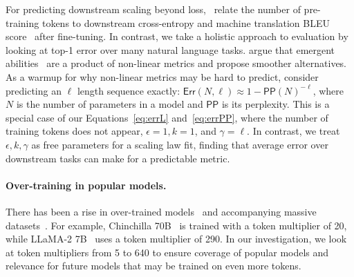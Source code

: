 For predicting downstream scaling beyond loss,~\citet{Isik2024ScalingLF} relate the number of pre-training tokens to downstream cross-entropy and machine translation BLEU score~\cite{papineni-etal-2002-bleu} after fine-tuning. 
In contrast, we take a holistic approach to evaluation by looking at top-1 error over many natural language tasks. 
\citet{schaeffer2023emergent} argue that emergent abilities~\cite{wei2022emergent} are a product of non-linear metrics and propose smoother alternatives.
As a warmup for why non-linear metrics may be hard to predict, \citet{schaeffer2023emergent} consider predicting an $\ell$ length sequence exactly: $\textsf{Err}(N, \ell) \approx 1 - \textsf{PP}(N)^{-\ell}$, where $N$ is the number of parameters in a model and $\textsf{PP}$ is its perplexity.
This is a special case of our Equations~\eqref{eq:errL} and~\eqref{eq:errPP}, where the number of training tokens does not appear, $\epsilon = 1, k = 1$, and $\gamma = \ell$.
In contrast, we treat $\epsilon, k, \gamma$ as free parameters for a scaling law fit, finding that average error over downstream tasks can make for a predictable metric.

\paragraph{Over-training in popular models.} There has been a rise in over-trained models~\cite{llama,llama2} and accompanying massive datasets~\cite{rpj,refinedweb,soldaini2024dolma,albalak2024survey}. For example, Chinchilla 70B~\cite{chinchilla} is trained with a token multiplier of 20, while LLaMA-2 7B~\cite{llama2} uses a token multiplier of 290.
In our investigation, we look at token multipliers from 5 to 640 to ensure coverage of popular models and relevance for future models that may be trained on even more tokens.